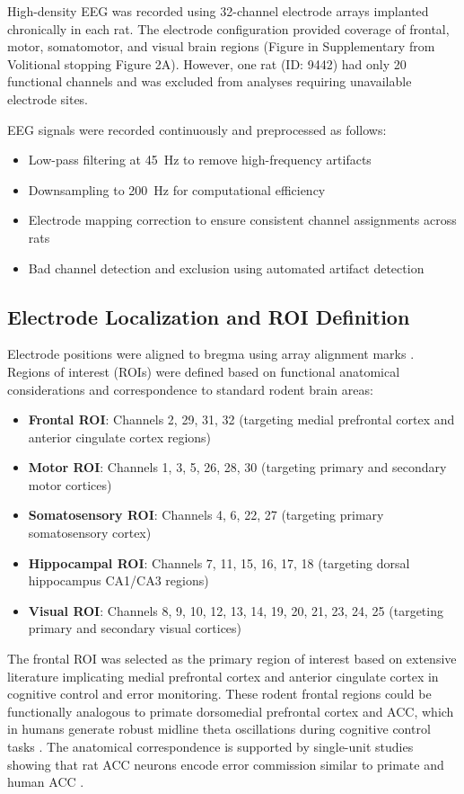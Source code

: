 \documentclass[11pt]{article}
\begin{document}
High-density EEG was recorded using 32-channel electrode arrays implanted chronically in each rat. The electrode configuration provided coverage of frontal, motor, somatomotor, and visual brain regions (Figure in Supplementary from Volitional stopping Figure 2A). However, one rat (ID: 9442) had only 20 functional channels and was excluded from analyses requiring unavailable electrode sites.

EEG signals were recorded continuously and preprocessed as follows:
\begin{itemize}
\item Low-pass filtering at 45~Hz to remove high-frequency artifacts
\item Downsampling to 200~Hz for computational efficiency
\item Electrode mapping correction to ensure consistent channel assignments across rats
\item Bad channel detection and exclusion using automated artifact detection
\end{itemize}

\subsection{Electrode Localization and ROI Definition}

Electrode positions were aligned to bregma using array alignment marks \citep{doutel2024volitional}. Regions of interest (ROIs) were defined based on functional anatomical considerations and correspondence to standard rodent brain areas:

\begin{itemize}
\item \textbf{Frontal ROI}: Channels 2, 29, 31, 32 (targeting medial prefrontal cortex and anterior cingulate cortex regions)
\item \textbf{Motor ROI}: Channels 1, 3, 5, 26, 28, 30 (targeting primary and secondary motor cortices)
\item \textbf{Somatosensory ROI}: Channels 4, 6, 22, 27 (targeting primary somatosensory cortex)
\item \textbf{Hippocampal ROI}: Channels 7, 11, 15, 16, 17, 18 (targeting dorsal hippocampus CA1/CA3 regions)
\item \textbf{Visual ROI}: Channels 8, 9, 10, 12, 13, 14, 19, 20, 21, 23, 24, 25 (targeting primary and secondary visual cortices)
\end{itemize}

The frontal ROI was selected as the primary region of interest based on extensive literature implicating medial prefrontal cortex and anterior cingulate cortex in cognitive control and error monitoring. These rodent frontal regions could be functionally analogous to primate dorsomedial prefrontal cortex and ACC, which in humans generate robust midline theta oscillations during cognitive control tasks \citep{cavanagh2014frontal}. The anatomical correspondence is supported by single-unit studies showing that rat ACC neurons encode error commission similar to primate and human ACC \citep{totah2009anterior}.
\end{document}

